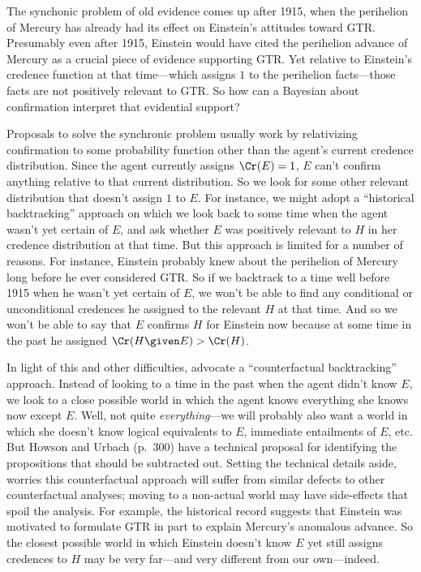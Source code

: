 The synchonic problem of old evidence comes up after 1915, when the perihelion of Mercury has already had its effect on Einstein's attitudes toward GTR. Presumably even after 1915, Einstein would have cited the perihelion advance of Mercury as a crucial piece of evidence supporting GTR. Yet relative to Einstein's credence function at that time---which assigns $1$ to the perihelion facts---those facts are not positively relevant to GTR. So how can a Bayesian about confirmation interpret that evidential support?

Proposals to solve the synchronic problem usually work by relativizing confirmation to some probability function other than the agent's current credence distribution. Since the agent currently assigns $\Cr(E)=1$, $E$ can't confirm anything relative to that current distribution. So we look for some other relevant distribution that doesn't assign $1$ to $E$. For instance, we might adopt a ``historical backtracking'' approach on which we look back to some time when the agent wasn't yet certain of $E$, and ask whether $E$ was positively relevant to $H$ in her credence distribution at that time. But this approach is limited for a number of reasons. For instance, Einstein probably knew about the perihelion of Mercury long before he ever considered GTR. So if we backtrack to a time well before 1915 when he wasn't yet certain of $E$, we won't be able to find any conditional or unconditional credences he assigned to the relevant $H$ at that time. And so we won't be able to say that $E$ confirms $H$ for Einstein now because at some time in the past he assigned $\Cr(H \given E)>\Cr(H)$.

In light of this and other difficulties, \citet{HowsonUrbach} advocate a ``counterfactual backtracking'' approach. Instead of looking to a time in the past when the agent didn't know $E$, we look to a close possible world in which the agent knows everything she knows now except $E$. Well, not quite \emph{everything}---we will probably also want a world in which she doesn't know logical equivalents to $E$, immediate entailments of $E$, etc. But Howson and Urbach (p.\ 300) have a technical proposal for identifying the propositions that should be subtracted out. Setting the technical details aside, \citet[p.\ 123]{EarmanBayes} worries this counterfactual approach will suffer from similar defects to other counterfactual analyses; moving to a non-actual world may have side-effects that spoil the analysis. For example, the historical record suggests that Einstein was motivated to formulate GTR in part to explain Mercury's anomalous advance. So the closest possible world in which Einstein doesn't know $E$ yet still assigns credences to $H$ may be very far---and very different from our own---indeed.

